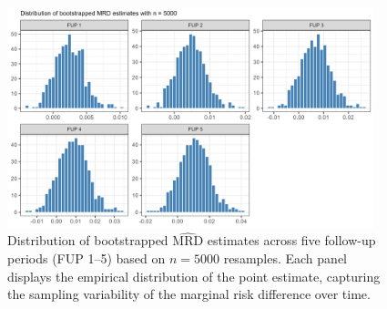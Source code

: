 \documentclass[pdflatex,sn-vancouver-ay]{sn-jnl}%
\theoremstyle{thmstyleone}%
\theoremstyle{thmstyletwo}%
\theoremstyle{thmstylethree}%
\begin{document}
\begin{appendices}
\begin{figure}[h]
\centering
\includegraphics[width=0.95\textwidth]{plots_dist/plot_BSdist_5000.png}
\caption{Distribution of bootstrapped $\widehat{\text{MRD}}$ estimates across five follow-up periods (FUP 1–5) based on $n = 5000$ resamples. Each panel displays the empirical distribution of the point estimate, capturing the sampling variability of the marginal risk difference over time.}\label{plt:bsdist5000}
\end{figure}





\end{appendices}

\end{document}
